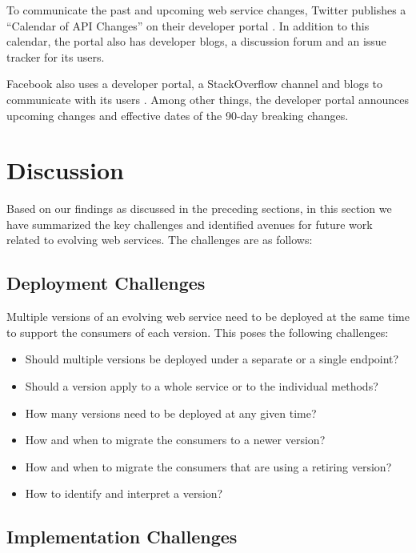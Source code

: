 \documentclass[runningheads,a4paper]{llncs}
\begin{document}
To communicate the past and upcoming web service changes, Twitter publishes a ``Calendar of API Changes'' on their developer portal \cite{twitter_calendar}. In addition to this calendar, the portal also has developer blogs, a discussion forum and an issue tracker for its users.

Facebook also uses a developer portal, a StackOverflow channel and blogs to communicate with its users \cite{facebook_stack_overflow}. Among other things, the developer portal announces upcoming changes and effective dates of the 90-day breaking changes.


\section{Discussion} %
\label{sec:discussion}

Based on our findings as discussed in the preceding sections, in this section we have summarized the key challenges and identified avenues for future work related to evolving web services. The challenges are as follows:

\subsection{Deployment Challenges} %
\label{sub:deployment_challenges}

Multiple versions of an evolving web service need to be deployed at the same time to support the consumers of each version. This poses the following challenges:
\begin{itemize}
  \item Should multiple versions be deployed under a separate or a single endpoint?
  \item Should a version apply to a whole service or to the individual methods?
  \item How many versions need to be deployed at any given time?
  \item How and when to migrate the consumers to a newer version?
  \item How and when to migrate the consumers that are using a retiring version?
  \item How to identify and interpret a version?
\end{itemize}


\subsection{Implementation Challenges} %
\label{sub:implementation_challenges}
\end{document}
